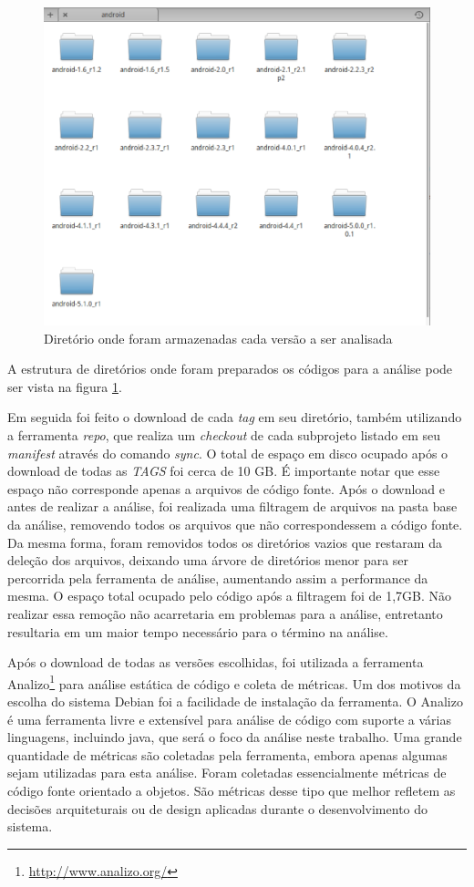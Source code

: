 \begin{figure}[!htb]
\centering
\includegraphics [keepaspectratio=true,scale=0.35]{figuras/folder.eps}
\caption{Diretório onde foram armazenadas cada versão a ser analisada}
\label{folder}
\end{figure}

A estrutura de diretórios onde foram preparados os códigos para a análise pode ser vista na figura \ref{folder}.

Em seguida foi feito o download de cada \textit{tag} em seu diretório, também utilizando a ferramenta \textit{repo}, que realiza um \textit{checkout} de cada subprojeto listado em seu \textit{manifest} através do comando \textit{sync}. O total de espaço em disco ocupado após o download de todas as \textit{TAGS} foi cerca de 10 GB. É importante notar que esse espaço não corresponde apenas a arquivos de código fonte. Após o download e antes de realizar a análise, foi realizada uma filtragem de arquivos na pasta base da análise, removendo todos os arquivos que não correspondessem a código fonte. Da mesma forma, foram removidos todos os diretórios vazios que restaram da deleção dos arquivos, deixando uma árvore de diretórios menor para ser percorrida pela ferramenta de análise, aumentando assim a performance da mesma. O espaço total ocupado pelo código após a filtragem foi de 1,7GB. Não realizar essa remoção não acarretaria em problemas para a análise, entretanto resultaria em um maior tempo necessário para o término na análise.

Após o download de todas as versões escolhidas, foi utilizada a ferramenta Analizo\footnote{\url{http://www.analizo.org/}}  para análise estática de código e coleta de métricas. Um dos motivos da escolha do sistema Debian foi a facilidade de instalação da ferramenta. O Analizo é uma ferramenta livre e extensível para análise de código com suporte a várias linguagens, incluindo java, que será o foco da análise neste trabalho. Uma grande quantidade de métricas são coletadas pela ferramenta, embora apenas algumas sejam utilizadas para esta análise. Foram coletadas essencialmente métricas de código fonte orientado a objetos. São métricas desse tipo que melhor refletem as decisões arquiteturais ou de design aplicadas durante o desenvolvimento do sistema.

